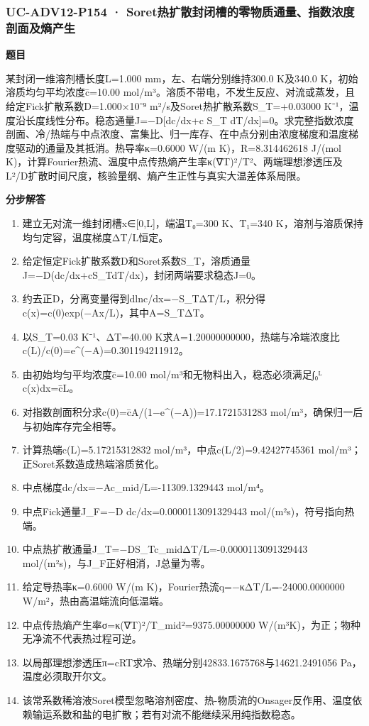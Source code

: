 \documentclass[UTF8,11pt,a4paper]{ctexart}
\begin{document}
\subsubsection*{UC-ADV12-P154 · Soret热扩散封闭槽的零物质通量、指数浓度剖面及熵产生}
\noindent\textbf{题目}\par
某封闭一维溶剂槽长度L=1.000 mm，左、右端分别维持300.0 K及340.0 K，初始溶质均匀平均浓度c̄=10.00 mol/m³。溶质不带电，不发生反应、对流或蒸发，且给定Fick扩散系数D=1.000×10⁻⁹ m²/s及Soret热扩散系数S\_T=+0.03000 K⁻¹，温度沿长度线性分布。稳态通量J=−D[dc/dx+c S\_T dT/dx]=0。求完整指数浓度剖面、冷/热端与中点浓度、富集比、归一库存、在中点分别由浓度梯度和温度梯度驱动的通量及其抵消。热导率κ=0.6000 W/(m K)，R=8.314462618 J/(mol K)，计算Fourier热流、温度中点传热熵产生率κ(∇T)²/T²、两端理想渗透压及L²/D扩散时间尺度，核验量纲、熵产生正性与真实大温差体系局限。\par
\medskip\noindent\textbf{分步解答}
\begin{enumerate}
\item 建立无对流一维封闭槽x∈[0,L]，端温T₀=300 K、T₁=340 K，溶剂与溶质保持均匀定容，温度梯度ΔT/L恒定。
\item 给定恒定Fick扩散系数D和Soret系数S\_T，溶质通量J=−D(dc/dx+cS\_TdT/dx)，封闭两端要求稳态J=0。
\item 约去正D，分离变量得到dlnc/dx=−S\_TΔT/L，积分得c(x)=c(0)exp(−Ax/L)，其中A=S\_TΔT。
\item 以S\_T=0.03 K⁻¹、ΔT=40.00 K求A=1.20000000000，热端与冷端浓度比c(L)/c(0)=e\textasciicircum{}(−A)=0.301194211912。
\item 由初始均匀平均浓度c̄=10.00 mol/m³和无物料出入，稳态必须满足∫₀ᴸ c(x)dx=c̄L。
\item 对指数剖面积分求c(0)=c̄A/(1−e\textasciicircum{}(−A))=17.1721531283 mol/m³，确保归一后与初始库存完全相等。
\item 计算热端c(L)=5.17215312832 mol/m³，中点c(L/2)=9.42427745361 mol/m³；正Soret系数造成热端溶质贫化。
\item 中点梯度dc/dx=−Ac\_mid/L=-11309.1329443 mol/m⁴。
\item 中点Fick通量J\_F=−D dc/dx=0.0000113091329443 mol/(m²s)，符号指向热端。
\item 中点热扩散通量J\_T=−DS\_Tc\_midΔT/L=-0.0000113091329443 mol/(m²s)，与J\_F正好相消，J总量为零。
\item 给定导热率κ=0.6000 W/(m K)，Fourier热流q=−κΔT/L=-24000.0000000 W/m²，热由高温端流向低温端。
\item 中点传热熵产生率σ=κ(∇T)²/T\_mid²=9375.00000000 W/(m³K)，为正；物种无净流不代表热过程可逆。
\item 以局部理想渗透压π=cRT求冷、热端分别42833.1675768与14621.2491056 Pa，温度必须取开尔文。
\item 该常系数稀溶液Soret模型忽略溶剂密度、热-物质流的Onsager反作用、温度依赖输运系数和盐的电扩散；若有对流不能继续采用纯指数稳态。
\end{enumerate}
\end{document}
